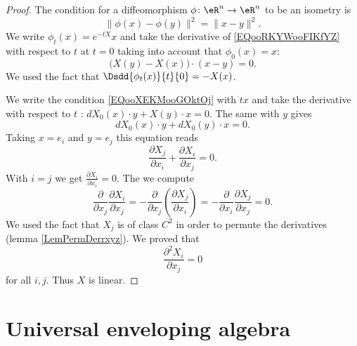 \begin{proof}
    The condition for a diffeomorphism \( \phi\colon \eR^n\to \eR^n\) to be an isometry is
    \begin{equation}        \label{EQooRKYWooFIKfYZ}
        \| \phi(x)- \phi(y) \|^2=\| x-y \|^2.
    \end{equation}
    We write \( \phi_t(x)= e^{-tX}x\) and take the derivative of \eqref{EQooRKYWooFIKfYZ} with respect to \( t\) at \( t=0\) taking into account that \( \phi_0(x)=x\):
    \begin{equation}        \label{EQooXEKMooGOktOj}
        \big( X(y)-X(x) \big)\cdot (x-y)=0.
    \end{equation}
    We used the fact that \( \Dsdd{ \phi_t(x) }{t}{0}=-X(x)\).

    We write the condition \eqref{EQooXEKMooGOktOj} with \( tx\) and take the derivative with respect to \( t\) : \( dX_0(x)\cdot y+X(y)\cdot x=0\). The same with \( y\) gives
    \begin{equation}
        dX_0(x)\cdot y+dX_0(y)\cdot x=0.
    \end{equation}
    Taking \( x=e_i\) and \( y=e_j\) this equation reads
    \begin{equation}
        \frac{ \partial X_j }{ \partial x_i }+\frac{ \partial X_i }{ \partial x_j }=0.
    \end{equation}
    With \( i=j\) we get \( \frac{ \partial X_i }{ \partial x_i }=0\). The we compute
    \begin{equation}
        \frac{ \partial  }{ \partial x_j }\frac{ \partial X_i }{ \partial x_j }=-\frac{ \partial  }{ \partial x_j }\left( \frac{ \partial X_j }{ \partial x_i } \right)=-\frac{ \partial  }{ \partial x_i }\frac{ \partial X_j }{ \partial x_j }=0.
    \end{equation}
    We used the fact that \( X_j\) is of class \( C^2\) in order to permute the derivatives (lemma \ref{LemPermDerrxyz}). We proved that 
    \begin{equation}
        \frac{ \partial^2 X_i  }{ \partial x_j }=0
    \end{equation}
    for all \( i,j\). Thus \( X\) is linear.
\end{proof}

\section{Universal enveloping algebra}  \label{subsec:env_alg}


